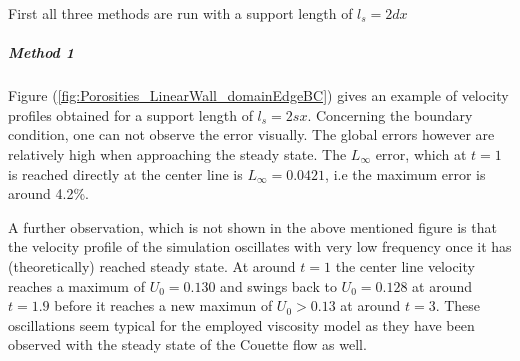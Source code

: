 \documentclass{report}
\begin{document}
First all three methods are run with a support length of $l_s=2dx$



\subparagraph{Method 1}


Figure (\ref{fig:Porosities_LinearWall_domainEdgeBC}) gives an example of velocity profiles obtained for a support length of $l_s=2sx$. Concerning the boundary condition, one can not observe the error visually.
The global errors however are relatively high when approaching the steady state. The $L_\infty$ error, which at $t=1$ is reached directly at the center line is $L_\infty=0.0421$, i.e the maximum error is around 4.2\%. 

A further observation, which is not shown in the above mentioned figure is that the velocity profile of the simulation oscillates with very low frequency once it has (theoretically) reached steady state. At around $t=1$ the center line velocity reaches a maximum of $U_0=0.130$ and swings back to $U_0=0.128$ at around $t=1.9$ before it reaches a new maximun of $U_0>0.13$ at around $t=3$. These oscillations seem typical for the employed viscosity model as they have been observed with the steady state of the Couette flow as well.  


\end{document}
